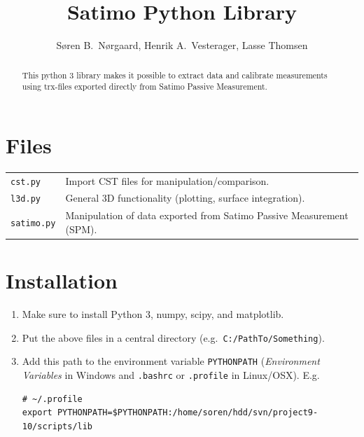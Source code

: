 \documentclass[10pt]{article}
\title{Satimo Python Library}
\author{Søren B.\ Nørgaard, Henrik A.\ Vesterager, Lasse Thomsen}
\begin{document}
\maketitle

\begin{abstract}
    This python 3 library makes it possible to extract data and calibrate measurements using trx-files exported directly from Satimo Passive Measurement.
\end{abstract}

\tableofcontents


\section{Files}
\begin{tabularx}{\linewidth}{lX}
    \texttt{cst.py} & Import CST files for manipulation/comparison. \\
    \texttt{l3d.py} & General 3D functionality (plotting, surface integration). \\
    \texttt{satimo.py} & Manipulation of data exported from Satimo Passive Measurement (SPM). 
\end{tabularx}

\section{Installation}
\begin{enumerate}
\item Make sure to install Python 3, numpy, scipy, and matplotlib.
\item Put the above files in a central directory (e.g.\ \texttt{C:/PathTo/Something}).
\item Add this path to the environment variable \texttt{PYTHONPATH} (\emph{Environment Variables} in Windows and \texttt{.bashrc} or \texttt{.profile} in Linux/OSX). E.g.\
    \begin{verbatim}
# ~/.profile
export PYTHONPATH=$PYTHONPATH:/home/soren/hdd/svn/project9-10/scripts/lib
    \end{verbatim}
\end{enumerate}
\end{document}

